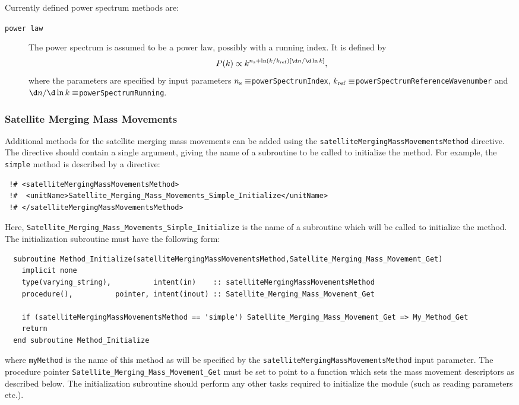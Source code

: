 Currently defined power spectrum methods are:
\begin{description}
 \item [{\tt power law}] The power spectrum is assumed to be a power law, possibly with a running index. It is defined by
\begin{equation}
 P(k)\propto k^{n_{\rm s} + \ln(k/k_{\rm ref}) [\d n /\d\ln k]},
\end{equation}
where the parameters are specified by input parameters $n_{\rm s}\equiv${\tt powerSpectrumIndex}, $k_{\rm ref}\equiv${\tt powerSpectrumReferenceWavenumber} and $\d n / \d \ln k \equiv${\tt powerSpectrumRunning}.
\end{description}

\subsubsection{Satellite Merging Mass Movements}

Additional methods for the satellite merging mass movements can be added using the {\tt satelliteMergingMassMovementsMethod} directive. The directive should contain a single argument, giving the name of a subroutine to be called to initialize the method. For example, the {\tt simple} method is described by a directive:
\begin{verbatim}
 !# <satelliteMergingMassMovementsMethod>
 !#  <unitName>Satellite_Merging_Mass_Movements_Simple_Initialize</unitName>
 !# </satelliteMergingMassMovementsMethod>
\end{verbatim}
Here, {\tt Satellite\_Merging\_Mass\_Movements\_Simple\_Initialize} is the name of a subroutine which will be called to initialize the method. The initialization subroutine must have the following form:
\begin{verbatim}
  subroutine Method_Initialize(satelliteMergingMassMovementsMethod,Satellite_Merging_Mass_Movement_Get)
    implicit none
    type(varying_string),          intent(in)    :: satelliteMergingMassMovementsMethod
    procedure(),          pointer, intent(inout) :: Satellite_Merging_Mass_Movement_Get
    
    if (satelliteMergingMassMovementsMethod == 'simple') Satellite_Merging_Mass_Movement_Get => My_Method_Get
    return
  end subroutine Method_Initialize
\end{verbatim}
where {\tt myMethod} is the name of this method as will be specified by the {\tt satelliteMergingMassMovementsMethod} input parameter. The procedure pointer {\tt Satellite\_Merging\_Mass\_Movement\_Get} must be set to point to a function which sets the mass movement descriptors as described below. The initialization subroutine should perform any other tasks required to initialize the module (such as reading parameters etc.).

